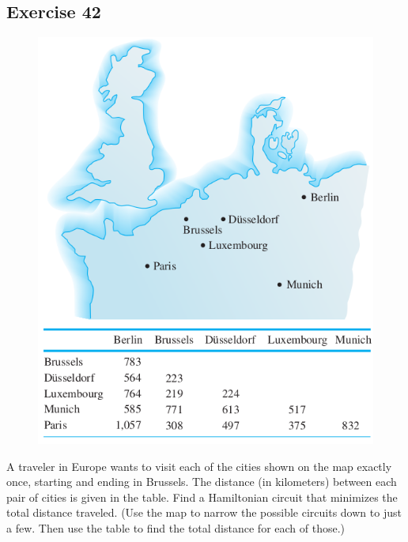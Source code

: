 \documentclass[14pt]{extarticle}
\begin{document}
\subsection{Exercise 42}
\begin{figure}[ht!]
    \centering
    \includegraphics[scale=0.45]{../images/10.1.42.png}
\end{figure}

A traveler in Europe wants to visit each of the cities shown on the map exactly once, starting and ending in Brussels. The
distance (in kilometers) between each pair of cities is given in the table. Find a Hamiltonian circuit that minimizes the
total distance traveled. (Use the map to narrow the possible circuits down to just a few. Then use the table to find the
total distance for each of those.)
\end{document}
